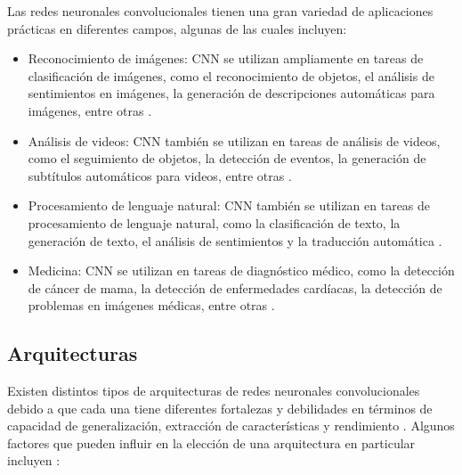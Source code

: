 Las redes neuronales convolucionales tienen una gran variedad de aplicaciones prácticas en diferentes campos, algunas
de las cuales incluyen:
\begin{itemize}
    \item Reconocimiento de imágenes: CNN se utilizan ampliamente en tareas de clasificación de imágenes, como el reconocimiento
          de objetos, el análisis de sentimientos en imágenes, la generación de descripciones automáticas para imágenes, entre
          otras \parencite{krizhevsky2017imagenet}.
    \item Análisis de videos: CNN también se utilizan en tareas de análisis de videos, como el seguimiento de objetos, la
          detección de eventos, la generación de subtítulos automáticos para videos, entre otras \parencite{simonyan2014twostream}.
    \item Procesamiento de lenguaje natural: CNN también se utilizan en tareas de procesamiento de lenguaje natural, como la
          clasificación de texto, la generación de texto, el análisis de sentimientos y la traducción automática \parencite{bugnon2020dl4papers}.
    \item Medicina: CNN se utilizan en tareas de diagnóstico médico, como la detección de cáncer de mama, la detección de
          enfermedades cardíacas, la detección de problemas en imágenes médicas, entre otras \parencite{wang2016deep}.
\end{itemize}

\subsection{Arquitecturas}

Existen distintos tipos de arquitecturas de redes neuronales convolucionales debido a que cada una tiene diferentes
fortalezas y debilidades en términos de capacidad de generalización, extracción de características y rendimiento \parencite{lecun2015deep}. Algunos factores que pueden influir en la elección de una arquitectura en particular incluyen \parencite{he2016deep}:

